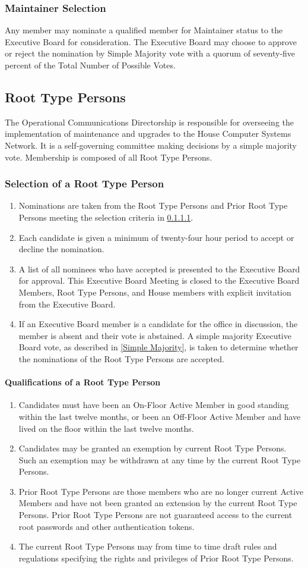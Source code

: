 \documentclass{article}
\newcommand{\asection}[1]{\subsection{#1} \label{#1}}
\newcommand{\asubsection}[1]{\subsubsection{#1} \label{#1}}
\newcommand{\asubsubsection}[1]{\paragraph{#1} \label{#1}}
\begin{document}
\asubsection{Maintainer Selection}
Any member may nominate a qualified member for Maintainer status to the Executive Board for consideration.
The Executive Board may choose to approve or reject the nomination by Simple Majority vote with a quorum of seventy-five percent of the Total Number of Possible Votes.

\asection{Root Type Persons}
The Operational Communications Directorship is responsible for overseeing the implementation of maintenance and upgrades to the House Computer Systems Network.
It is a self-governing committee making decisions by a simple majority vote.
Membership is composed of all Root Type Persons.

\asubsection{Selection of a Root Type Person}
\renewcommand{\theenumi}{\alph{enumi}} %
\begin{enumerate}
	\item Nominations are taken from the Root Type Persons and Prior Root Type Persons meeting the selection criteria in \ref{Qualifications of a Root Type Person}.
	\item Each candidate is given a minimum of twenty-four hour period to accept or decline the nomination.
	\item A list of all nominees who have accepted is presented to the Executive Board for approval.
		This Executive Board Meeting is closed to the Executive Board Members, Root Type Persons, and House members with explicit invitation from the Executive Board.
	\item If an Executive Board member is a candidate for the office in discussion, the member is absent and their vote is abstained.
		A simple majority Executive Board vote, as described in \ref{Simple Majority}, is taken to determine whether the nominations of the Root Type Persons are accepted.
\end{enumerate}

\asubsubsection{Qualifications of a Root Type Person}
\renewcommand{\theenumi}{\alph{enumi}} %
\begin{enumerate}
	\item Candidates must have been an On-Floor Active Member in good standing within the last twelve months, or been an Off-Floor Active Member and have lived on the floor within the last twelve months.
	\item Candidates may be granted an exemption by current Root Type Persons.
		Such an exemption may be withdrawn at any time by the current Root Type Persons.
	\item Prior Root Type Persons are those members who are no longer current Active Members and have not been granted an extension by the current Root Type Persons.
		Prior Root Type Persons are not guaranteed access to the current root passwords and other authentication tokens.
	\item The current Root Type Persons may from time to time draft rules and regulations specifying the rights and privileges of Prior Root Type Persons.
\end{enumerate}
\end{document}
